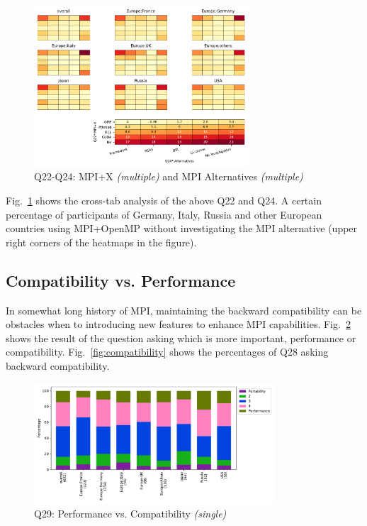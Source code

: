 \documentclass[conference,10pt,letterpaper]{IEEEtran}
\begin{document}
\begin{figure}[htb]
\begin{center}
\includegraphics[width=8cm]{Figs/Q22-Q24.pdf}
\caption{Q22-Q24: MPI+X {\it(multiple)} and MPI Alternatives {\it(multiple)}}
\label{fig:mpi-x-and-alternatives}
\end{center}
\end{figure}

Fig.~\ref{fig:mpi-x-and-alternatives} shows the cross-tab analysis of
the above Q22 and Q24. A certain percentage of participants of
Germany, Italy, Russia and other European countries using MPI+OpenMP
without investigating the MPI alternative (upper right corners of the
heatmaps in the figure). 

\subsection{Compatibility vs. Performance}

In somewhat long history of MPI, maintaining the backward
compatibility can be obstacles when to introducing new features to
enhance MPI capabilities. Fig.~\ref{fig:performance-vs-compatibility} shows the 
result of the question asking which is more important, performance or 
compatibility. Fig.~\ref{fig:compatibility} shows the percentages of
Q28 asking backward compatibility.

\begin{figure}[htb]
\begin{center}
\includegraphics[width=9cm]{Figs/Q29.pdf}
\caption{Q29: Performance vs. Compatibility {\it(single)}}
\label{fig:performance-vs-compatibility}
\end{center}
\end{figure}
\end{document}
